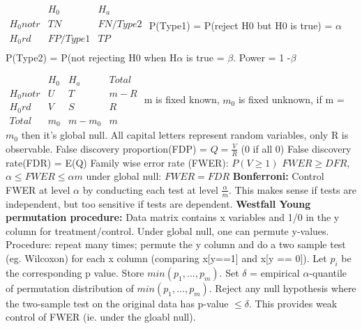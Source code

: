 $\begin{matrix}
& H_0 & H_a  \\
H_0 not r & TN & FN/Type2\\
H_0rd & FP/Type1 & TP \\
\end{matrix}$
P(Type1) = P(reject H0 but H0 is true) = $\alpha$
P(Type2) = P(not rejecting H0 when H$\alpha$ is true = $\beta$. Power = 1 -$\beta$

$\begin{matrix}
& H_0 & H_a & Total \\
H_0 not r & U & T & m-R\\
H_0rd & V & S & R \\
Total & m_0 & m-m_0 & m
\end{matrix}$
m is fixed known, $m_0$ is fixed unknown, if m = $m_0$ then it's global null. All capital letters represent random variables, only R is observable. 
False discovery proportion(FDP) = $Q = \frac{V}{R}$ (0 if all 0)
False discovery rate(FDR) = E(Q) 
Family wise error rate (FWER): $P(V \geq 1)$
$FWER \geq DFR$, $\alpha \leq FWER \leq \alpha m$ under global null: $FWER = FDR$
\textbf{Bonferroni: } Control FWER at level $\alpha$ by conducting each test at level $\frac{\alpha}{m}$. This makes sense if tests are independent, but too sensitive if tests are dependent. 
\textbf{Westfall Young permutation procedure: } Data matrix contains x variables and 1/0 in the y column for treatment/control. Under global null, one can permute y-values. Procedure: repeat many times; permute the y column and do a two sample test (eg. Wilcoxon) for each x column (comparing x[y==1] and x[y == 0]). Let $p_i$ be the corresponding p value. Store $min(p_1,...,p_m)$. Set $\delta$ = empirical $\alpha$-quantile of permutation distribution of $min(p_1,...,p_m)$. Reject any null hypothesis where the two-sample test on the original data has p-value $\leq \delta$. This provides weak control of FWER (ie. under the gloabl null). 